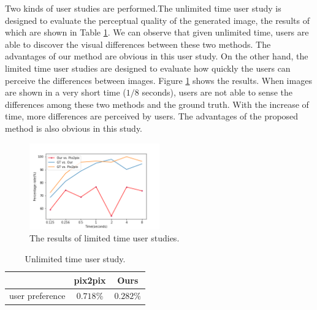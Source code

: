 Two kinds of user studies are performed.The unlimited time user study is designed to evaluate the perceptual quality of the generated image, the results of which are shown in Table \ref{table:unlimited_time}. We can observe that given unlimited time, users are able to discover the visual differences between these two methods. The advantages of our method are obvious in this user study. On the other hand, the limited time user studies are designed to evaluate how quickly the users can perceive the differences between images. Figure \ref{fig:limited_time} shows the results. When images are shown in a very short time ($1/8$ seconds), users are not able to sense the differences among these two methods and the ground truth. With the increase of time, more differences are perceived by users. The advantages of the proposed method is also obvious in this study.
%
\begin{figure}
	\includegraphics[width=0.5\textwidth]{figures/limited_time}
	\caption{The results of limited time user studies. }
	\label{fig:limited_time}
\end{figure}
%
%
\begin{table}[h]
	\centering	
	\caption{Unlimited time user study.}
	\begin{tabular}{|l|c|c|}\hline
		 & pix2pix \cite{pix2pix} & Ours \\\hline
		user preference&$0.718\%$&$0.282\%$\\\hline
	\end{tabular}
	\label{table:unlimited_time}
\end{table}


